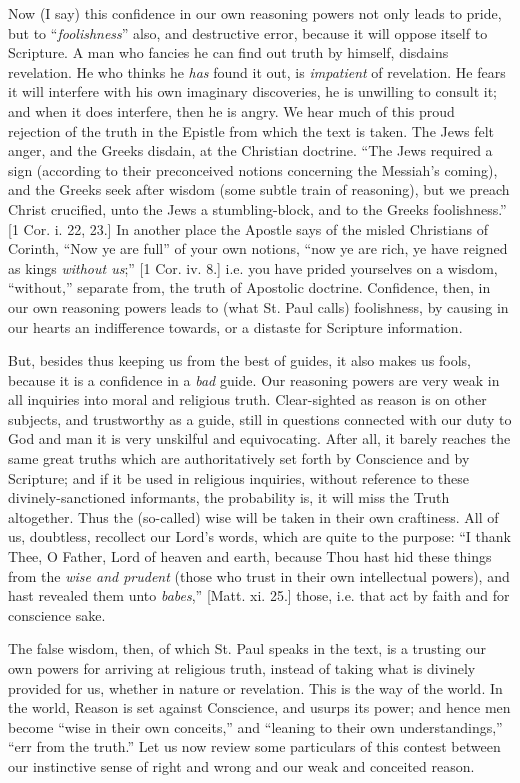 Now (I say) this confidence in our own reasoning
powers not only leads to pride, but to ``\emph{foolishness}''
also, and destructive error, because it will oppose
itself to Scripture. A man who fancies he can find out
truth by himself, disdains revelation. He who thinks he \emph{has}
found it out, is \emph{impatient} of revelation. He
fears it will interfere with his own imaginary
discoveries, he is unwilling to consult it; and when it
does interfere, then he is angry. We hear much of this
proud rejection of the truth in the Epistle from which
the text is taken. The Jews felt anger, and the Greeks
disdain, at the Christian doctrine. ``The Jews
required a sign (according to their preconceived notions
concerning the Messiah's coming), and the Greeks seek
after wisdom (some subtle train of reasoning), but we
preach Christ crucified, unto the Jews a stumbling-block,
and to the Greeks foolishness.'' [1 Cor. i. 22, 23.]
In another place the Apostle says of the misled
Christians of Corinth, ``Now ye are full'' of
your own notions, ``now ye are rich, ye have reigned
as kings \emph{without us};'' [1 Cor. iv. 8.] i.e. you have
prided yourselves on a wisdom, ``without,''
separate from, the truth of Apostolic doctrine.
Confidence, then, in our own reasoning powers leads to
(what St. Paul calls) foolishness, by causing in our
hearts an indifference towards, or a distaste for
Scripture information.

But, besides thus keeping us from the best of guides,
it also makes us fools, because it is a confidence in a \emph{bad}
guide. Our reasoning powers are very weak in all
inquiries into moral and religious truth. Clear-sighted
as reason is on other subjects, and trustworthy as a
guide, still in questions connected with our duty to God
and man it is very unskilful and equivocating. After all,
it barely reaches the same great truths which are
authoritatively set forth by Conscience and by Scripture;
and if it be used in religious inquiries, without
reference to these divinely-sanctioned informants, the
probability is, it will miss the Truth altogether. Thus
the (so-called) wise will be taken in their own
craftiness. All of us, doubtless, recollect our Lord's
words, which are quite to the purpose: ``I thank
Thee, O Father, Lord of heaven and earth, because Thou
hast hid these things from the \emph{wise and prudent}
(those who trust in their own intellectual powers), and
hast revealed them unto \emph{babes},'' [Matt. xi. 25.]
those, i.e. that act by faith and for conscience sake.

The false wisdom, then, of which St. Paul speaks in
the text, is a trusting our own powers for arriving at
religious truth, instead of taking what is divinely
provided for us, whether in nature or revelation. This is
the way of the world. In the world, Reason is set against
Conscience, and usurps its power; and hence men become
``wise in their own conceits,'' and ``leaning
to their own understandings,'' ``err from the
truth.'' Let us now review some particulars of this
contest between our instinctive sense of right and wrong
and our weak and conceited reason.

